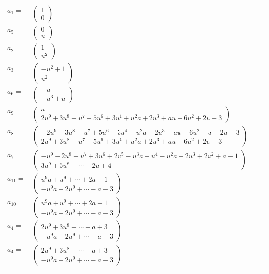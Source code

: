 \documentclass[1p]{elsarticle_modified}
\theoremstyle{definition}
\begin{document}
\begin{tabular}{m{7pt} m{180pt} m{7pt} m{180pt} }
\flushright $a_{1}=$&$\begin{pmatrix}1\\0\end{pmatrix}$ \\
\flushright $a_{5}=$&$\begin{pmatrix}0\\u\end{pmatrix}$ \\
\flushright $a_{2}=$&$\begin{pmatrix}1\\u^2\end{pmatrix}$ \\
\flushright $a_{3}=$&$\begin{pmatrix}- u^2+1\\u^2\end{pmatrix}$ \\
\flushright $a_{6}=$&$\begin{pmatrix}- u\\- u^3+u\end{pmatrix}$ \\
\flushright $a_{9}=$&$\begin{pmatrix}a\\2 u^9+3 u^8+u^7-5 u^6+3 u^4+u^2 a+2 u^3+a u-6 u^2+2 u+3\end{pmatrix}$ \\
\flushright $a_{8}=$&$\begin{pmatrix}-2 u^9-3 u^8- u^7+5 u^6-3 u^4- u^2 a-2 u^3- a u+6 u^2+a-2 u-3\\2 u^9+3 u^8+u^7-5 u^6+3 u^4+u^2 a+2 u^3+a u-6 u^2+2 u+3\end{pmatrix}$ \\
\flushright $a_{7}=$&$\begin{pmatrix}- u^9-2 u^8- u^7+3 u^6+2 u^5- u^3 a- u^4- u^2 a-2 u^3+2 u^2+a-1\\3 u^9+5 u^8+\cdots+2 u+4\end{pmatrix}$ \\
\flushright $a_{11}=$&$\begin{pmatrix}u^9 a+u^9+\cdots+2 a+1\\- u^9 a-2 u^9+\cdots- a-3\end{pmatrix}$ \\
\flushright $a_{10}=$&$\begin{pmatrix}u^9 a+u^9+\cdots+2 a+1\\- u^9 a-2 u^9+\cdots- a-3\end{pmatrix}$ \\
\flushright $a_{4}=$&$\begin{pmatrix}2 u^9+3 u^8+\cdots- a+3\\- u^9 a-2 u^9+\cdots- a-3\end{pmatrix}$\\ \flushright $a_{4}=$&$\begin{pmatrix}2 u^9+3 u^8+\cdots- a+3\\- u^9 a-2 u^9+\cdots- a-3\end{pmatrix}$\\&\end{tabular}
\end{document}

